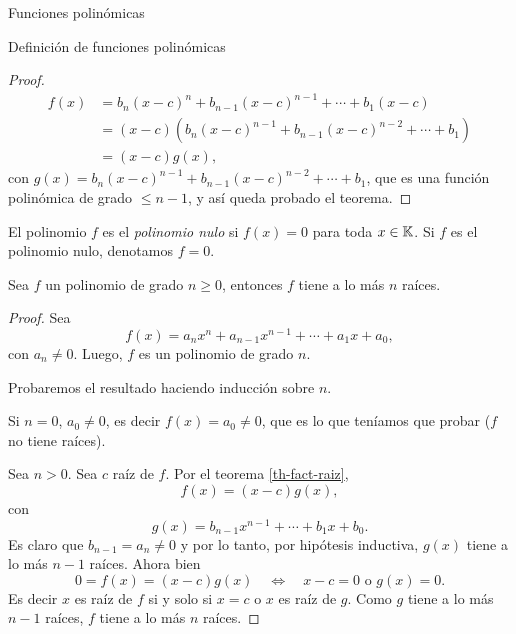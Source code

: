 \begin{chapter}{Funciones polinómicas}
\begin{section}{Definición de funciones polinómicas}
\begin{proof}
      \begin{align*}
          f(x) & = b_n(x-c)^n + b_{n-1}(x-c)^{n-1}+\cdots + b_1(x-c)       \\
               & = (x-c)(b_n(x-c)^{n-1} + b_{n-1}(x-c)^{n-2}+\cdots + b_1) \\
               & =(x-c)g(x),
      \end{align*}
      con $g(x) =b_n(x-c)^{n-1} + b_{n-1}(x-c)^{n-2}+\cdots + b_1$,  que es una función polinómica de grado $\le n-1$, y así queda probado el teorema.
  \end{proof}

  El polinomio $f$ es el \textit{polinomio nulo} si $f(x)=0$ para toda $x \in \mathbb K$. Si $f$ es el polinomio nulo,  denotamos $f =0$.

  \begin{teorema}\label{th-pol-raiz}
      Sea $f$ un polinomio de grado $n \ge 0$, entonces $f$ tiene a lo  más  $n$ raíces.
  \end{teorema}
  \begin{proof}
      Sea
      \begin{equation*}
          f(x) = a_nx^n + a_{n-1}x^{n-1}+\cdots + a_1x +a_0,
      \end{equation*}
      con $a_n \ne 0$. Luego,  $f$ es un polinomio de grado $n$.

      Probaremos el resultado haciendo inducción sobre $n$.

      Si $n=0$, $a_0 \ne 0$, es decir  $f(x)=a_0\ne 0$, que es lo que teníamos que probar ($f$ no tiene raíces).


      Sea $n>0$. Sea $c$ raíz de $f$. Por  el teorema \ref{th-fact-raiz},
      \begin{equation*}
          f(x) = (x-c)g(x),
      \end{equation*}
      con
      \begin{equation*}
          g(x) = b_{n-1}x^{n-1} + \cdots + b_1x +b_0.
      \end{equation*}
      Es claro que $b_{n-1} = a_n \ne 0$ y por lo tanto, por hipótesis inductiva, $g(x)$ tiene a lo más $n-1$ raíces. Ahora bien
      \begin{equation*}
          0 =f(x) = (x-c)g(x) \quad \Leftrightarrow \quad x-c=0 \text{ o } g(x) =0.
      \end{equation*}
      Es decir $x$ es raíz de $f$ si y solo si $x=c$ o $x$ es raíz de $g$. Como $g$ tiene a lo más $n-1$ raíces,  $f$ tiene a lo más $n$ raíces.
  \end{proof}


\end{section}
\end{chapter}
